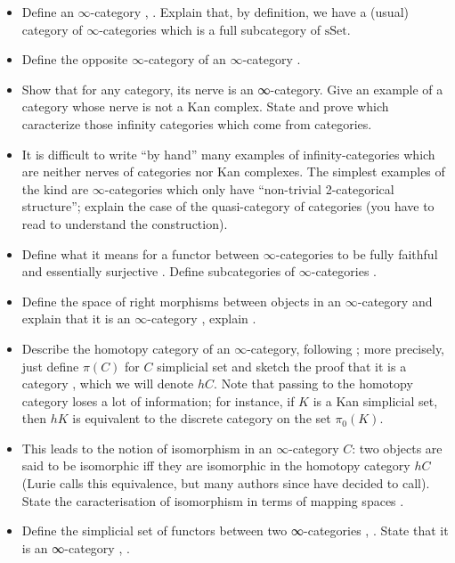 \documentclass{amsart}
\theoremstyle{definition}
\theoremstyle{remark}
\begin{document}
\begin{itemize}
\item Define an $\infty$-category \cite[Def.1.7]{Groth}, \cite[Def.1.1.2.4]{HTT}. Explain that, by definition, we have a (usual) category of $\infty$-categories which is a full subcategory of $\mathrm{sSet}$. 
\item Define the opposite $\infty$-category of an $\infty$-category \cite[\S 1.2.1]{HTT}.  
\item Show that for any category, its nerve is an ∞-category. Give an example of a category whose nerve is not a Kan complex. State and prove \cite[Proposition 1.1.2.2]{HTT} which caracterize those infinity categories which come from categories.
\item It is difficult to write \enquote{by hand} many examples of infinity-categories which are neither nerves of categories nor Kan complexes. The simplest examples of the kind are $\infty$-categories which only have \enquote{non-trivial 2-categorical structure}; explain the case of the quasi-category of categories \cite[8.3]{Rezk} (you have to read \cite[8.2]{Rezk} to understand the construction).
\item Define what it means for a functor between $\infty$-categories to be fully faithful and essentially surjective \cite[1.2.10.1]{HTT}. Define subcategories of $\infty$-categories \cite[\S 1.2.11]{HTT}.
\item Define the space of right morphisms between objects in an $\infty$-category and explain that it is an $\infty$-category \cite[Prop. 1.2.2.3]{HTT}, explain \cite[Rmk. 1.2.2.4]{HTT}. 
\item Describe the homotopy category of an $\infty$-category, following \cite[\S 1.2.3]{HTT}; more precisely, just define $\pi(C)$ for $C$ simplicial set and sketch the proof that it is a category \cite[1.2.3.7-8]{HTT}, which we will denote $hC$. Note that passing to the homotopy category loses a lot of information; for instance, if $K$ is a Kan simplicial set, then $hK$ is equivalent to the discrete category on the set $\pi_{0}(K)$.
\item This leads to the notion of isomorphism in an $\infty$-category $C$: two objects are said to be isomorphic iff they are isomorphic in the homotopy category $hC$ (Lurie calls this equivalence, but many authors since have decided to call). State the caracterisation of isomorphism in terms of mapping spaces \cite[Prop. 1.2.4.1]{HTT}. 
\item Define the simplicial set of functors between two ∞-categories \cite[Def.2.1]{Groth}, \cite[Not.1.2.7.2]{HTT}. State that it is an ∞-category \cite[Prop.2.5(i)]{Groth}, \cite[1.2.7.3]{HTT}.
\end{itemize}
\end{document}
